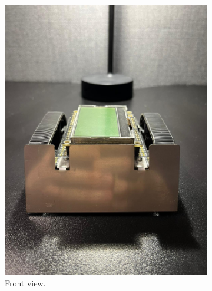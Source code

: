 \documentclass{l4proj}
\begin{document}
\begin{figure}
    \begin{subfigure}{0.24\textwidth}
        \centering
        \includegraphics[width=\textwidth]{images/robot-front.jpg}
        \caption{Front view.}
        \label{fig:front-view}  
    \end{subfigure}
    \begin{subfigure}{0.24\textwidth}
        \centering

\end{subfigure}
\end{figure}
\end{document}
